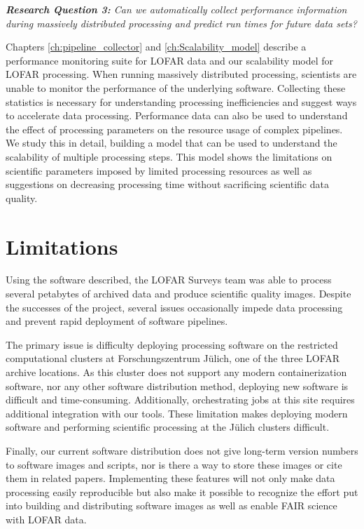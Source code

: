 \begin{addmargin}[4em]{8em}%
    \emph{\textbf{Research Question 3:} Can we automatically collect performance information during massively distributed processing and predict run times for future data sets?}
\end{addmargin}

Chapters \ref{ch:pipeline_collector} and \ref{ch:Scalability_model} describe a performance monitoring suite for LOFAR data and our scalability model for LOFAR processing. When running massively distributed processing, scientists are unable to monitor the performance of the underlying software. Collecting these statistics is necessary for understanding processing inefficiencies and suggest ways to accelerate data processing. Performance data can also be used to understand the effect of processing parameters on the resource usage of complex pipelines. We study this in detail, building a model that can be used to understand the scalability of multiple processing steps. This model shows the limitations on scientific parameters imposed by limited processing resources as well as suggestions on decreasing processing time without sacrificing scientific data quality. 

\section{Limitations}

Using the software described, the LOFAR Surveys team was able to process several petabytes of archived data and produce scientific quality images. Despite the successes of the project, several issues occasionally impede data processing and prevent rapid deployment of software pipelines.

The primary issue is difficulty deploying processing software on the restricted computational clusters at Forschungszentrum J{\"u}lich, one of the three LOFAR archive locations. As this cluster does not support any modern containerization software, nor any other software distribution method, deploying new software is difficult and time-consuming. Additionally, orchestrating jobs at this site requires additional integration with our tools. These limitation makes deploying modern software and performing scientific processing at the J{\"u}lich clusters difficult. 

Finally, our current software distribution does not give long-term version numbers to software images and scripts, nor is there a way to store these images or cite them in related papers. Implementing these features will not only make data processing easily reproducible but also make it possible to recognize the effort put into building and distributing software images as well as enable FAIR science with LOFAR data\citep{wilkinson2016fair}.


